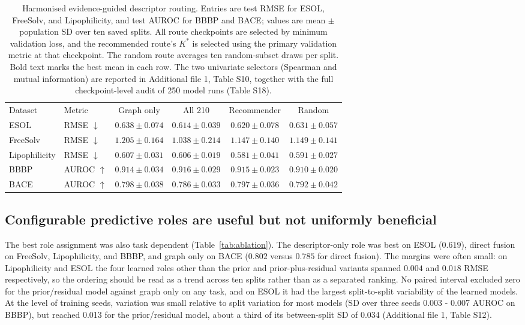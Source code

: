 \begin{table}[t]
\caption{Harmonised evidence-guided descriptor routing. Entries are test RMSE for ESOL, FreeSolv, and Lipophilicity, and test AUROC for BBBP and BACE; values are mean $\pm$ population SD over ten saved splits. All route checkpoints are selected by minimum validation loss, and the recommended route's $K^*$ is selected using the primary validation metric at that checkpoint. The random route averages ten random-subset draws per split. Bold text marks the best mean in each row. The two univariate selectors (Spearman and mutual information) are reported in Additional file 1, Table S10, together with the full checkpoint-level audit of 250 model runs (Table S18).}
\label{tab:routing}
\centering
\footnotesize
\setlength{\tabcolsep}{3.2pt}
\begin{tabular}{@{}llcccc@{}}
\toprule
Dataset & Metric & Graph only & All 210 & Recommender & Random \\
ESOL & RMSE $\downarrow$ & $0.638\pm0.074$ & $\mathbf{0.614\pm0.039}$ & $0.620\pm0.078$ & $0.631\pm0.057$ \\
FreeSolv & RMSE $\downarrow$ & $1.205\pm0.164$ & $\mathbf{1.038\pm0.214}$ & $1.147\pm0.140$ & $1.149\pm0.141$ \\
Lipophilicity & RMSE $\downarrow$ & $0.607\pm0.031$ & $0.606\pm0.019$ & $\mathbf{0.581\pm0.041}$ & $0.591\pm0.027$ \\
BBBP & AUROC $\uparrow$ & $0.914\pm0.034$ & $\mathbf{0.916\pm0.029}$ & $0.915\pm0.023$ & $0.910\pm0.020$ \\
BACE & AUROC $\uparrow$ & $\mathbf{0.798\pm0.038}$ & $0.786\pm0.033$ & $0.797\pm0.036$ & $0.792\pm0.042$ \\
\bottomrule
\end{tabular}
\end{table}

\subsection{Configurable predictive roles are useful but not uniformly beneficial}\label{subsec:modularity-results}

The best role assignment was also task dependent (Table~\ref{tab:ablation}). The descriptor-only role was best on ESOL ($0.619$), direct fusion on FreeSolv, Lipophilicity, and BBBP, and graph only on BACE ($0.802$ versus $0.785$ for direct fusion). The margins were often small: on Lipophilicity and ESOL the four learned roles other than the prior and prior-plus-residual variants spanned $0.004$ and $0.018$ RMSE respectively, so the ordering should be read as a trend across ten splits rather than as a separated ranking. No paired interval excluded zero for the prior/residual model against graph only on any task, and on ESOL it had the largest split-to-split variability of the learned models. At the level of training seeds, variation was small relative to split variation for most models (SD over three seeds 0.003 - 0.007 AUROC on BBBP), but reached 0.013 for the prior/residual model, about a third of its between-split SD of 0.034 (Additional file 1, Table S12).


